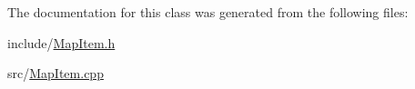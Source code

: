 The documentation for this class was generated from the following files\-:\begin{DoxyCompactItemize}
\item 
include/\hyperlink{MapItem_8h}{Map\-Item.\-h}\item 
src/\hyperlink{MapItem_8cpp}{Map\-Item.\-cpp}\end{DoxyCompactItemize}

